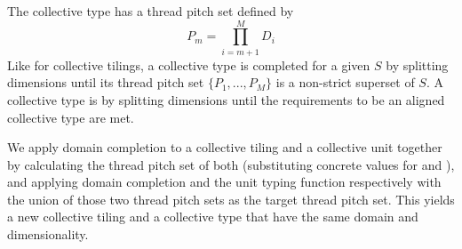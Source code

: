 The collective type has a thread pitch set defined by
\begin{equation}
  P_m = \prod_{i = m+1}^M D_i
\end{equation}
Like for collective tilings, a collective type is completed for a given  $S$ by splitting dimensions until its thread pitch set $\{P_1, ..., P_M\}$ is a non-strict superset of $S$.
A collective type is  by splitting dimensions until the requirements to be an aligned collective type are met.

\filbreak
{}

We apply domain completion to a collective tiling and a collective unit together by calculating the thread pitch set of both (substituting concrete values for  and ), and applying domain completion and the unit typing function respectively with the union of those two thread pitch sets as the target thread pitch set.
This yields a new collective tiling and a collective type that have the same domain and dimensionality.

\filbreak
{}


